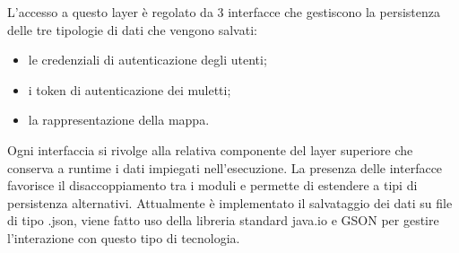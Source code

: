 L'accesso a questo layer è regolato da 3 interfacce che gestiscono la persistenza delle tre tipologie di dati che vengono salvati:
\begin{itemize}
	\item le credenziali di autenticazione degli utenti;
	\item i token di autenticazione dei muletti;
	\item la rappresentazione della mappa.
\end{itemize}

Ogni interfaccia si rivolge alla relativa componente del layer superiore che conserva a runtime i dati impiegati nell'esecuzione. La presenza delle interfacce favorisce il disaccoppiamento tra i moduli e permette di estendere a tipi di persistenza alternativi. Attualmente è implementato il salvataggio dei dati su file di tipo .json, viene fatto uso della libreria standard java.io e GSON per gestire l'interazione con questo tipo di tecnologia.


\pagebreak
